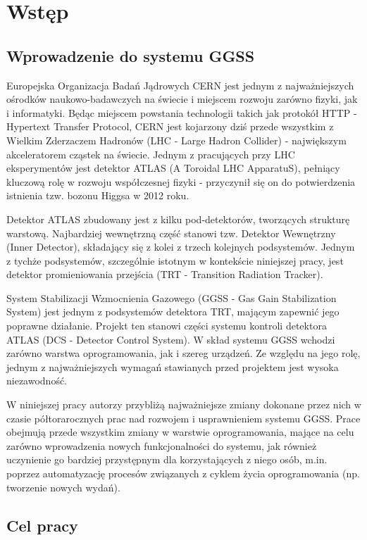 \chapter{Wstęp}
\label{cha:wstep}

\section{Wprowadzenie do systemu GGSS}

Europejska Organizacja Badań Jądrowych CERN jest jednym z najważniejszych ośrodków naukowo-badawczych na świecie i miejscem rozwoju zarówno fizyki, jak i informatyki. Będąc miejscem powstania technologii takich jak protokół HTTP - Hypertext Transfer Protocol, CERN jest kojarzony dziś przede wszystkim z Wielkim Zderzaczem Hadronów (LHC - Large Hadron Collider) - największym akceleratorem cząstek na świecie. Jednym z pracujących przy LHC eksperymentów jest detektor ATLAS (A Toroidal LHC ApparatuS), pełniący kluczową rolę w rozwoju współczesnej fizyki - przyczynił się on do potwierdzenia istnienia tzw. bozonu Higgsa w 2012 roku. 

Detektor ATLAS zbudowany jest z kilku pod-detektorów, tworzących strukturę warstową. Najbardziej wewnętrzną część stanowi tzw. Detektor Wewnętrzny (Inner Detector), składający się z kolei z trzech kolejnych podsystemów. Jednym z tychże podsystemów, szczególnie istotnym w kontekście niniejszej pracy, jest detektor promieniowania przejścia (TRT - Transition Radiation Tracker). 

System Stabilizacji Wzmocnienia Gazowego (GGSS - Gas Gain Stabilization System) jest jednym z podsystemów detektora TRT, mającym zapewnić jego poprawne działanie. Projekt ten stanowi części systemu kontroli detektora ATLAS (DCS - Detector Control System). W skład systemu GGSS wchodzi zarówno warstwa oprogramowania, jak i szereg urządzeń. Ze względu na jego rolę, jednym z najważniejszych wymagań stawianych przed projektem jest wysoka niezawodność.

W niniejszej pracy autorzy przybliżą najważniejsze zmiany dokonane przez nich w czasie półtorarocznych prac nad rozwojem i usprawnieniem systemu GGSS. Prace obejmują przede wszystkim zmiany w warstwie oprogramowania, mające na celu zarówno wprowadzenia nowych funkcjonalności do systemu, jak również uczynienie go bardziej przystępnym dla korzystających z niego osób, m.in. poprzez automatyzację procesów związanych z cyklem życia oprogramowania (np. tworzenie nowych wydań).


\section{Cel pracy}